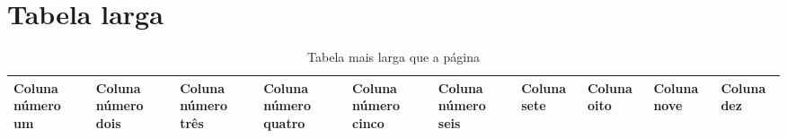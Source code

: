 \documentclass{abntex2-ufv}
\begin{document}
\textual
\chapter{Tabela larga}
\begin{table}[htbp]
\begin{tabela}{\caption{Tabela mais larga que a página}\label{tab:larga}}{}
  \begin{tabular}{llllllllll}
    \toprule
    Coluna número um & Coluna número dois & Coluna número três & Coluna número quatro & Coluna número cinco & Coluna número seis & Coluna sete & Coluna oito & Coluna nove & Coluna dez \\
    \bottomrule
  \end{tabular}
\end{tabela}
\end{table}
\end{document}
